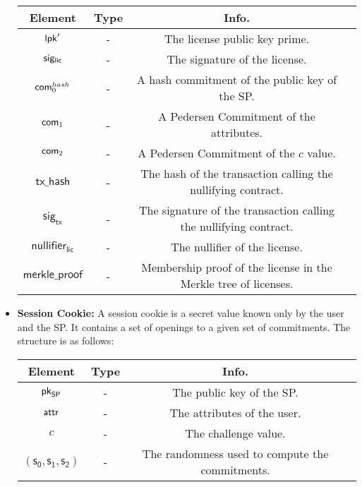 \begin{itemize}
    \begin{center}
        \begin{tabular}{ |c|c|c|c| } 
        \hline
        \textbf{Element} & \textbf{Type} & \textbf{Info.} \\
        \hline
        $\mathsf{lpk}'$ & - & The license public key prime.\\ 
        $\mathsf{sig_{lic}}$ & - & The signature of the license. \\ 
        $\mathsf{com}_0^{hash}$ & - & A hash commitment of the public key of the SP. \\ 
        $\mathsf{com}_1$ & - & A Pedersen Commitment of the attributes. \\ 
        $\mathsf{com}_2$ & - & A Pedersen Commitment of the $c$ value. \\ 
        $\mathsf{tx\_hash}$ & - & The hash of the transaction calling the nullifying contract. \\ 
        $\mathsf{sig}_\mathsf{tx}$ & - & The signature of the transaction calling the nullifying contract. \\ 
        $\mathsf{nullifier}_\mathsf{lic}$ & - & The nullifier of the license. \\ 
        $\mathsf{merkle\_proof}$ & - & Membership proof of the license in the Merkle tree of licenses. \\ 

        \hline
        \end{tabular}
    \end{center}

    \item \textbf{Session Cookie:} A session cookie is a secret value known only by the user and the SP. It contains a set of openings to a given set of commitments. The structure is as follows:

    \begin{center}
        \begin{tabular}{ |c|c|c|c| } 
        \hline
        \textbf{Element} & \textbf{Type} & \textbf{Info.} \\
        \hline
        $\mathsf{pk}_{\mathsf{SP}}$ & - & The public key of the SP. \\ 
        $\mathsf{attr}$ & - & The attributes of the user. \\ 
        $c$ & - & The challenge value. \\ 
        $(\mathsf{s_0}, \mathsf{s_1}, \mathsf{s_2})$ & - & The randomness used to compute the commitments. \\

        \hline
        \end{tabular}
    \end{center}

\end{itemize}